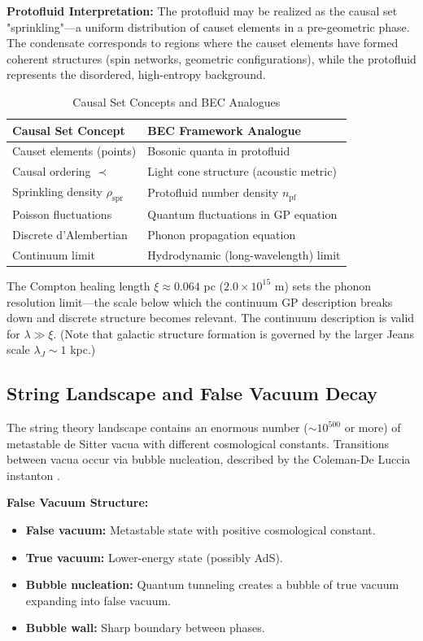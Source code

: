 \documentclass[11pt,a4paper]{article}
\theoremstyle{definition}
\theoremstyle{remark}
\begin{document}
\textbf{Protofluid Interpretation:} The protofluid may be realized as the causal set "sprinkling"---a uniform distribution of causet elements in a pre-geometric phase. The condensate corresponds to regions where the causet elements have formed coherent structures (spin networks, geometric configurations), while the protofluid represents the disordered, high-entropy background.

\begin{table}[H]
\centering
\caption{Causal Set Concepts and BEC Analogues}
\label{tab:causet_bec}
\begin{tabular}{@{}ll@{}}
\toprule
\textbf{Causal Set Concept} & \textbf{BEC Framework Analogue} \\
\midrule
Causet elements (points) & Bosonic quanta in protofluid \\
Causal ordering $\prec$ & Light cone structure (acoustic metric) \\
Sprinkling density $\rho_{\mathrm{spr}}$ & Protofluid number density $n_{\mathrm{pf}}$ \\
Poisson fluctuations & Quantum fluctuations in GP equation \\
Discrete d'Alembertian & Phonon propagation equation \\
Continuum limit & Hydrodynamic (long-wavelength) limit \\
\bottomrule
\end{tabular}
\end{table}

The Compton healing length $\xi \approx 0.064$ pc ($2.0 \times 10^{15}$ m) sets the phonon resolution limit---the scale below which the continuum GP description breaks down and discrete structure becomes relevant. The continuum description is valid for $\lambda \gg \xi$. (Note that galactic structure formation is governed by the larger Jeans scale $\lambda_J \sim 1$ kpc.)

\subsection{String Landscape and False Vacuum Decay}
\label{sec:string_landscape}

The string theory landscape \cite{Susskind2003,Bousso2000} contains an enormous number ($\sim 10^{500}$ or more) of metastable de Sitter vacua with different cosmological constants. Transitions between vacua occur via bubble nucleation, described by the Coleman-De Luccia instanton \cite{Coleman1980}.

\textbf{False Vacuum Structure:}
\begin{itemize}
\item \textbf{False vacuum:} Metastable state with positive cosmological constant.
\item \textbf{True vacuum:} Lower-energy state (possibly AdS).
\item \textbf{Bubble nucleation:} Quantum tunneling creates a bubble of true vacuum expanding into false vacuum.
\item \textbf{Bubble wall:} Sharp boundary between phases.
\end{itemize}
\end{document}
